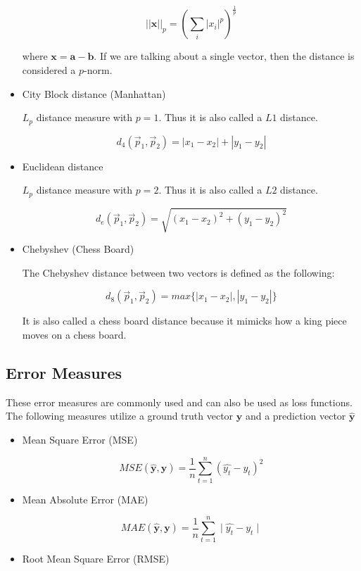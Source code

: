 \documentclass{article}
\begin{document}
\begin{multicols}{3}
\begin{itemize}
$$
||\mathbf{x}||_p = \left(\sum_{i} | x_i |^p \right)^{\frac{1}{p}}
$$

where $\mathbf{x} = \mathbf{a} - \mathbf{b}$. If we are talking about a single vector, then the distance is considered a $p$-norm.

\item City Block distance (Manhattan)

$L_p$ distance measure with $p=1$. Thus it is also called a $L1$ distance.

$$
d_4(\vec p_1, \vec p_2) = | x_1 - x_2 | + | y_1 - y_2 |
$$

\item Euclidean distance

$L_p$ distance measure with $p=2$. Thus it is also called a $L2$ distance.

$$
d_e(\vec p_1, \vec p_2) = \sqrt{(x_1 - x_2)^2 + (y_1 - y_2)^2}
$$

\item Chebyshev (Chess Board)

The Chebyshev distance between two vectors is defined as the following:

$$
d_8(\vec p_1, \vec p_2) = max\{| x_1 - x_2 |, | y_1 - y_2 |\}
$$

It is also called a chess board distance because it mimicks how a king piece moves on a chess board.

\end{itemize}

\subsection{Error Measures}

These error measures are commonly used and can also be used as loss functions. The following measures utilize a ground truth vector $\mathbf{y}$ and a prediction vector $\mathbf{\hat y}$

\begin{itemize}
\itemsep0em
\item Mean Square Error (MSE)

$$
MSE(\mathbf{\hat y}, \mathbf{y}) = \frac{1}{n}\sum_{t=1}^n (\hat{y_t} - y_t)^2
$$

\item Mean Absolute Error (MAE)

$$
MAE(\mathbf{\hat y}, \mathbf{y}) = \frac{1}{n}\sum_{t=1}^n \mid \hat{y_t} - y_t \mid
$$

\item Root Mean Square Error (RMSE)


\end{itemize}
\end{multicols}
\end{document}
